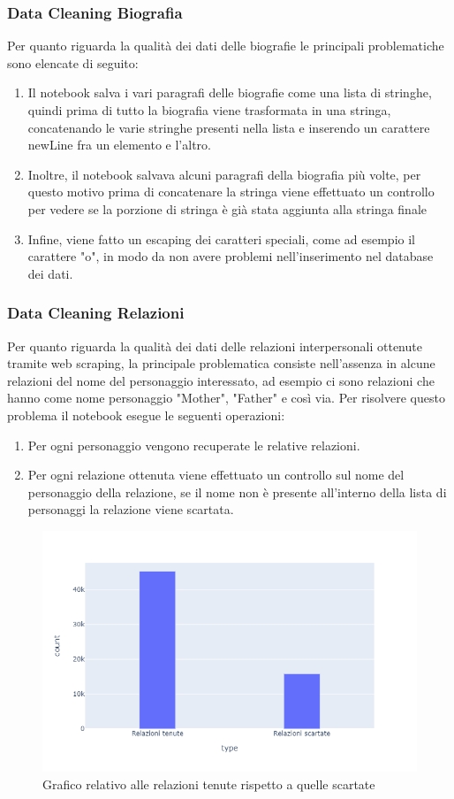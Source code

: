\documentclass[
12pt, %
a4paper, %
oneside, %
headinclude,footinclude, %
BCOR5mm, %
]{scrartcl}
\begin{document}
\subsubsection{Data Cleaning Biografia}
Per quanto riguarda la qualità dei dati delle biografie le principali problematiche sono elencate di seguito:
\begin{enumerate}
	\item Il notebook salva i vari paragrafi delle biografie come una lista di stringhe, quindi prima di tutto la biografia viene trasformata in una stringa, concatenando le varie stringhe presenti nella lista e inserendo un carattere newLine fra un elemento e l'altro.
	\item Inoltre, il notebook  salvava alcuni paragrafi della biografia più volte, per questo motivo prima di concatenare la stringa viene effettuato un controllo per vedere se la porzione di stringa è già stata aggiunta alla stringa finale
	\item Infine, viene fatto un escaping dei caratteri speciali, come ad esempio il carattere "o", in modo da non avere problemi nell'inserimento nel database dei dati.
\end{enumerate}
\subsubsection{Data Cleaning Relazioni}
Per quanto riguarda la qualità dei dati delle relazioni interpersonali ottenute tramite web scraping, la principale problematica consiste nell'assenza in alcune relazioni del nome del personaggio interessato, ad esempio ci sono relazioni che hanno come nome personaggio "Mother", "Father" e così via.
Per risolvere questo problema il notebook esegue le seguenti operazioni:
\begin{enumerate}
	\item Per ogni personaggio vengono recuperate le relative relazioni.
	\item Per ogni relazione ottenuta viene effettuato un controllo sul nome del personaggio della relazione, se il nome non è presente all'interno della lista di personaggi la relazione viene scartata.
\end{enumerate}
\begin{figure}[H]
  \includegraphics[scale=0.5]{./Figures/plot_relazioni.png}
  \caption{Grafico relativo alle relazioni tenute rispetto a quelle scartate}
\end{figure}
\end{document}
